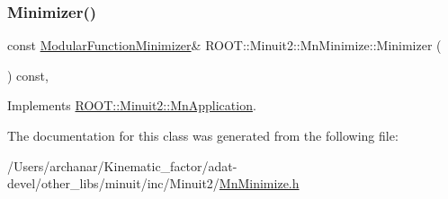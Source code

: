 \subsubsection{\texorpdfstring{Minimizer()}{Minimizer()}\hspace{0.1cm}{\footnotesize\ttfamily [3/3]}}
{\footnotesize\ttfamily const \mbox{\hyperlink{classROOT_1_1Minuit2_1_1ModularFunctionMinimizer}{Modular\+Function\+Minimizer}}\& R\+O\+O\+T\+::\+Minuit2\+::\+Mn\+Minimize\+::\+Minimizer (\begin{DoxyParamCaption}{ }\end{DoxyParamCaption}) const\hspace{0.3cm}{\ttfamily [inline]}, {\ttfamily [virtual]}}



Implements \mbox{\hyperlink{classROOT_1_1Minuit2_1_1MnApplication_a5a8e1e2658b731b5f4023dd1b1594223}{R\+O\+O\+T\+::\+Minuit2\+::\+Mn\+Application}}.



The documentation for this class was generated from the following file\+:\begin{DoxyCompactItemize}
\item 
/\+Users/archanar/\+Kinematic\+\_\+factor/adat-\/devel/other\+\_\+libs/minuit/inc/\+Minuit2/\mbox{\hyperlink{adat-devel_2other__libs_2minuit_2inc_2Minuit2_2MnMinimize_8h}{Mn\+Minimize.\+h}}\end{DoxyCompactItemize}
